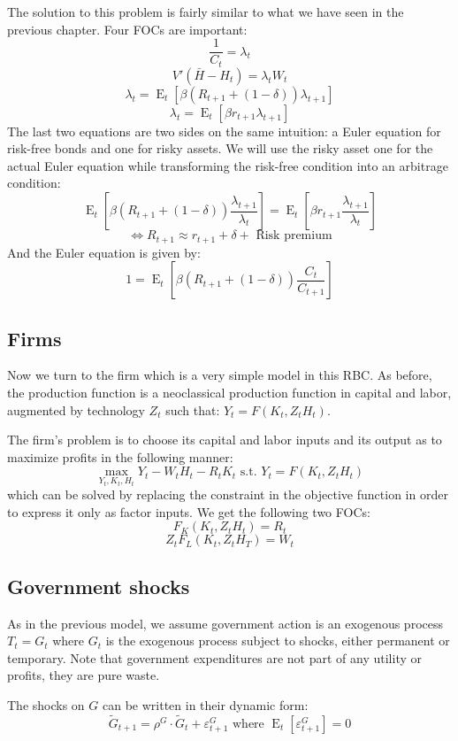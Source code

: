 \documentclass[12pt]{report}
\newcommand{\Et}[1]{\operatorname{E}_t\left[#1\right]}
\begin{document}
The solution to this problem is fairly similar to what we have seen in the previous chapter. Four FOCs are important: $$\frac{1}{C_t} = \lambda_t $$ $$V'(\bar H - H_t) = \lambda_t W_t $$ $$ \lambda_{t} = \Et{\beta(R_{t+1} + (1-\delta))\lambda_{t+1}} $$ $$\lambda_t = \Et{\beta r_{t+1}\lambda_{t+1}} $$ The last two equations are two sides on the same intuition: a Euler equation for risk-free bonds and one for risky assets. We will use the risky asset one for the actual Euler equation while transforming the risk-free condition into an arbitrage condition: $$ \Et{\beta(R_{t+1} + (1-\delta))\frac{\lambda_{t+1}}{\lambda_{t}}} = \Et{\beta r_{t+1}\frac{\lambda_{t+1}}{\lambda_{t}}} $$ $$\Leftrightarrow R_{t+1} \approx r_{t+1} + \delta + \text{ Risk premium} $$ And the Euler equation is given by: $$1 = \Et{\beta(R_{t+1} + (1-\delta))\frac{C_{t}}{C_{t+1}}} $$

\subsection{Firms}

Now we turn to the firm which is a very simple model in this RBC. As before, the production function is a neoclassical production function in capital and labor, augmented by technology $Z_t$ such that: $Y_t = F(K_t, Z_tH_t)$.

The firm's problem is to choose its capital and labor inputs and its output as to maximize profits in the following manner: $$\max_{Y_t, K_t, H_t} Y_t - W_tH_t - R_tK_t \text{ s.t. } Y_t = F(K_t, Z_tH_t) $$ which can be solved by replacing the constraint in the objective function in order to express it only as factor inputs. We get the following two FOCs: $$F_K(K_t, Z_tH_t) = R_t $$ $$ Z_tF_L(K_t, Z_tH_T) = W_t $$

\subsection{Government shocks}

As in the previous model, we assume government action is an exogenous process $T_t = G_t$ where $G_t$ is the exogenous process subject to shocks, either permanent or temporary. Note that government expenditures are not part of any utility or profits, they are pure waste.

The shocks on $G$ can be written in their dynamic form: $$\tilde G_{t+1} = \rho^G\cdot \tilde G_{t} + \varepsilon_{t+1}^G \text{ where } \Et{\varepsilon_{t+1}^G} = 0 $$
\end{document}
